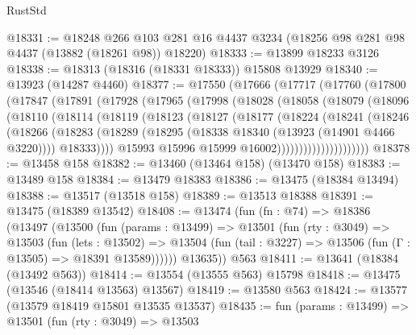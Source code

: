 \begin{lexlean}{RustStd}
\begin{coremodule}
@18331 := @18248
    @266
    @103
    @281
    @16
    @4437
    @3234
    (@18256 @98 @281 @98 @4437 (@13882 (@18261 @98)) @18220)
@18333 := @13899 @18233 @3126
@18338 := @18313 (@18316 (@18331 @18333)) @15808 @13929
@18340 := @13923 (@14287 @4460)
@18377 := @17550
    (@17666
      (@17717
        (@17760
          (@17800
            (@17847
              (@17891
                (@17928
                  (@17965
                    (@17998
                      (@18028
                        (@18058
                          (@18079
                            (@18096
                              (@18110
                                (@18114
                                  (@18119
                                    (@18123
                                      (@18127
                                        (@18177
                                          (@18224
                                            (@18241
                                              (@18246
                                                (@18266
                                                  (@18283
                                                    (@18289
                                                      (@18295
                                                        (@18338
                                                          @18340
                                                          (@13923 (@14901 @4466 @3220))))
                                                      @18333))))
                                              @15993
                                              @15996
                                              @15999
                                              @16002)))))))))))))))))))))
@18378 := @13458 @158
@18382 := @13460 (@13464 @158) (@13470 @158)
@18383 := @13489 @158
@18384 := @13479 @18383
@18386 := @13475 (@18384 @13494)
@18388 := @13517 (@13518 @158)
@18389 := @13513 @18388
@18391 := @13475 (@18389 @13542)
@18408 := @13474
    (fun (fn : @74) =>
    @18386
      (@13497
        (@13500
          (fun (params : @13499) =>
          @13501
            (fun (rty : @3049) =>
            @13503
              (fun (lets : @13502) =>
              @13504 (fun (tail : @3227) => @13506 (fun (Γ : @13505) => @18391 @13589))))))
        @13635))
    @563
@18411 := @13641 (@18384 (@13492 @563))
@18414 := @13554 (@13555 @563) @15798
@18418 := @13475 (@13546 (@18414 @13563) @13567)
@18419 := @13580 @563
@18424 := @13577 (@13579 @18419 @15801 @13535 @13537)
@18435 := fun (params : @13499) =>
  @13501
    (fun (rty : @3049) =>
    @13503

\end{coremodule}
\end{lexlean}
